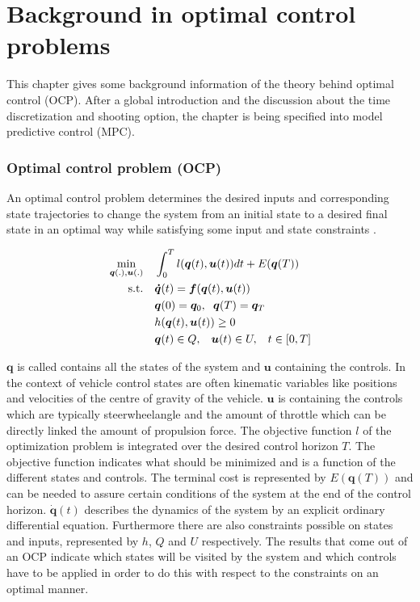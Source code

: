 \chapter{Background in optimal control problems\\}
\label{cha:3}

This chapter gives some background information of the theory behind optimal control (OCP). After a global introduction and the discussion about the time discretization and shooting option, the chapter is being specified into model predictive control (MPC).\\

\subsection{Optimal control problem (OCP)}
An optimal control problem determines the desired inputs and corresponding state trajectories to change the system from an initial state to a desired final state in an optimal way while satisfying some input and state constraints \cite{Mercy2018}.

\begin{equation}
\label{eq:OCP}
\begin{aligned}
\min_{\bm{q}(.),\bm{u}(.)} \quad & \int_{0}^{T}l(\bm{q}(t),\bm{u}(t))dt + E(\bm{q}(T)) \\
\textrm{s.t.} \quad & \bm{\dot{q}}(t) = \bm{f}(\bm{q}(t), \bm{u}(t))\\
& \bm{q}(0)= \bm{q}_{0},\hspace{2 mm}\bm{q}(T)= \bm{q}_{T}    \\
& h(\bm{q}(t),\bm{u}(t)) \geq 0	\\
& \bm{q}(t)\in Q,\hspace{3 mm} \bm{u}(t)\in U, \hspace{3 mm} t\in [0, T]
\end{aligned}
\end{equation}

$\bm{q}$ is called contains all the states of the system and $\bm{u}$ containing the controls. In the context of vehicle control states are often kinematic variables like positions and velocities of the centre of gravity of the vehicle. $\bm{u}$ is containing the controls which are typically steerwheelangle and the amount of throttle which can be directly linked the amount of propulsion force. The objective function $l$ of the optimization problem is integrated over the desired control horizon $T$. The objective function indicates what should be minimized and is a function of the different states and controls. The terminal cost is represented by $E(\bm{q}(T))$ and can be needed to assure certain conditions of the system at the end of the control horizon. $\bm{\dot{q}}(t)$ describes the dynamics of the system by an explicit ordinary differential equation. Furthermore there are also constraints possible on states and inputs, represented by $h$, $Q$ and $U$ respectively. The results that come out of an OCP indicate which states will be visited by the system and which controls have to be applied in order to do this with respect to the constraints on an optimal manner. \cite{Patrinos2019}\\ 

